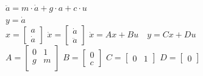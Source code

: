 \begin{tcolorbox}[colback=green!5!white,colframe=green!75!black,title=\textbf{Example for State Space Model}]
	$\ddot{a} = m \cdot \dot{a} + g\cdot a + c \cdot u$\\
	$y = \dot{a}$\\
	$x = \begin{bmatrix}
		a \\ \dot{a}
	\end{bmatrix}$
	$
	\dot{x} = \begin{bmatrix}
	\dot{a} \\ \ddot{a}
	\end{bmatrix}
	$
	$ \dot x = Ax+Bu \quad y = Cx+Du $
	\\
	$
	A = \begin{bmatrix}
	0 & 1 \\
	g & m \\
	\end{bmatrix}
	$
	$ B= \begin{bmatrix}
	0 \\
	c
	\end{bmatrix}$
	$C = \begin{bmatrix}
	0 & 1
	\end{bmatrix} $
	$D = \begin{bmatrix}
	0
	\end{bmatrix}$
\end{tcolorbox}

